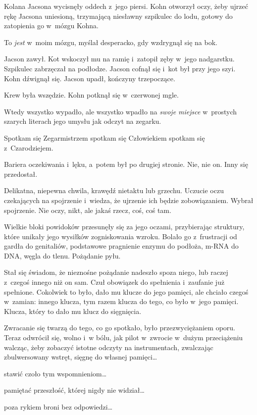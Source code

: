 \documentclass[oneside,polish,11pt,sfheadings]{mwbk}
\begin{document}
Kolana Jacsona wycisnęły oddech z~jego piersi. Kohn otworzył oczy, żeby
ujrzeć rękę Jacsona uniesioną, trzymającą niesławny szpikulec do lodu,
gotowy do zatopienia go w~mózgu Kohna.

To \emph{jest} w~moim mózgu, myślał desperacko, gdy wzdrygnął się na
bok.

Jacson zawył. Kot wskoczył mu na ramię i~zatopił zęby w~jego nadgarstku.
Szpikulec zabrzęczał na podłodze. Jacson cofnął się i~kot był przy jego
szyi. Kohn dźwignął się. Jacson upadł, kończyny trzepoczące.

Krew była wszędzie. Kohn potknął się w~czerwonej mgle.

Wtedy wszystko wypadło, ale wszystko wpadło na \emph{swoje miejsce} w~prostych szarych literach jego umysłu jak odczyt na zegarku.

Spotkam się Zegarmistrzem spotkam się Człowiekiem spotkam się z~Czarodziejem.

Bariera oczekiwania i~lęku, a~potem był po drugiej stronie. Nie, nie on.
Inny się przedostał.

Delikatna, niepewna chwila, krawędź nietaktu lub grzechu. Uczucie oczu
czekających na spojrzenie i~wiedza, że ujrzenie ich będzie
zobowiązaniem. Wybrał spojrzenie. Nie oczy, nikt, ale jakaś rzecz, coś,
coś tam.

Wielkie bloki powidoków przesunęły się za jego oczami, przybierając
struktury, które unikały jego wysiłków zogniskowania wzroku. Bolało go z~frustracji od gardła do genitaliów, podstawowe pragnienie enzymu do
podłoża, m-RNA do DNA, węgla do tlenu. Pożądanie pyłu.

Stał się świadom, że nieznośne pożądanie nadeszło spoza niego, lub
raczej z~czegoś innego niż on sam. Czuł obowiązek do spełnienia i~zaufanie już spełnione. Cokolwiek to było, dało mu klucze do jego
pamięci, ale chciało czegoś w~zamian: innego klucza, tym razem klucza do
tego, co było w~jego pamięci. Klucza, który to dało mu klucz do
sięgnięcia.

Zwracanie się twarzą do tego, co go spotkało, było przezwyciężaniem
oporu. Teraz odwrócił się, wolno i~w bólu, jak pilot w~zwrocie w~dużym
przeciążeniu walcząc, żeby zobaczyć istotne odczyty na instrumentach,
zwalczając zbulwersowany wstręt, sięgnę do własnej pamięci\ldots

stawić czoło tym wspomnieniom\ldots

pamiętać przeszłość, której nigdy nie widział\ldots

poza rykiem broni bez odpowiedzi\ldots
\end{document}
